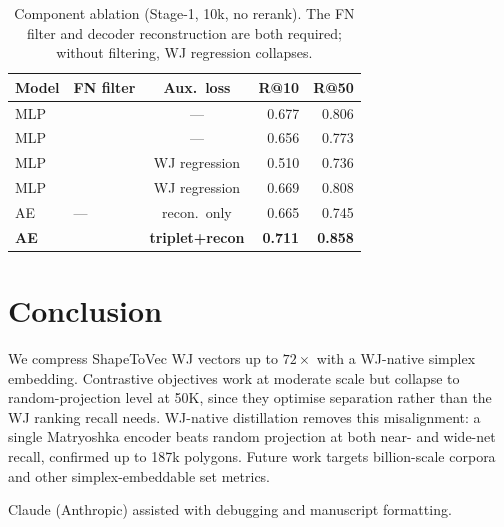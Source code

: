 \documentclass[sigconf]{acmart}
\newcommand{\cmark}{\ding{51}}\newcommand{\xmark}{\ding{55}}
\begin{document}
\begin{table}[t]\centering
\caption{Component ablation (Stage-1, 10k, no rerank). The FN filter and decoder
reconstruction are both required; without filtering, WJ regression collapses.}
\label{tab:ablation}\small\setlength{\tabcolsep}{4pt}
\begin{tabular}{@{}llcrr@{}}
\toprule
Model & FN filter & Aux.\ loss & R@10 & R@50 \\
\midrule
MLP & \xmark & ---           & 0.677 & 0.806 \\
MLP & \cmark & ---           & 0.656 & 0.773 \\
MLP & \xmark & WJ regression & 0.510 & 0.736 \\
MLP & \cmark & WJ regression & 0.669 & 0.808 \\
AE  & ---    & recon.\ only  & 0.665 & 0.745 \\
\textbf{AE} & \cmark & \textbf{triplet+recon} & \textbf{0.711} & \textbf{0.858} \\
\bottomrule
\end{tabular}
\end{table}

\section{Conclusion}
We compress ShapeToVec WJ vectors up to $72\times$ with a WJ-native simplex embedding.
Contrastive objectives work at moderate scale but collapse to random-projection level
at 50K, since they optimise separation rather than the WJ ranking recall needs.
WJ-native distillation removes this misalignment: a single Matryoshka encoder beats
random projection at both near- and wide-net recall, confirmed up to 187k polygons.
Future work targets billion-scale corpora and other simplex-embeddable set metrics.

\begin{acks}
Claude (Anthropic) assisted with debugging and manuscript formatting.
\end{acks}



\end{document}
